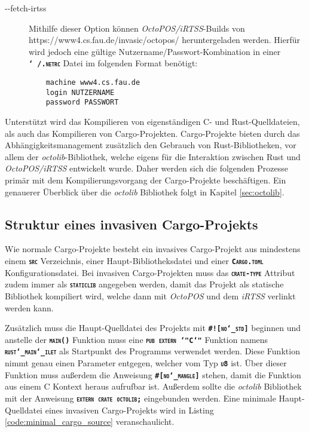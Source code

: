 \begin{description}
	\item[-{}-fetch-irtss]
	Mithilfe dieser Option können \textit{OctoPOS/iRTSS}-Builds von \\
	https://www4.cs.fau.de/invasic/octopos/ heruntergeladen werden. Hierfür wird jedoch
	eine gültige Nutzername/Passwort-Kombination in einer \texttt{\textsc{\textbf{\char`~/.netrc}}}
	Datei im folgenden Format benötigt:
	\begin{verbatim}
	machine www4.cs.fau.de
	login NUTZERNAME
	password PASSWORT
	\end{verbatim}
\end{description}

Unterstützt wird das Kompilieren von eigenständigen C- und Rust-Quelldateien, als auch das Kompilieren von
Cargo-Projekten. Cargo-Projekte bieten durch das Abhängigkeitsmanagement zusätzlich den Gebrauch
von Rust-Bibliotheken, vor allem der \textit{octolib}-Bibliothek,
welche eigens für die Interaktion zwischen Rust und \textit{OctoPOS/iRTSS}
entwickelt wurde.
Daher werden sich die folgenden Prozesse primär mit dem Kompilierungsvorgang der Cargo-Projekte
beschäftigen.
Ein genauerer Überblick über die \textit{octolib} Bibliothek folgt in Kapitel \ref{sec:octolib}.

\subsection{Struktur eines invasiven Cargo-Projekts}

Wie normale Cargo-Projekte besteht ein invasives Cargo-Projekt aus mindestens einem
\texttt{\textsc{\textbf{src}}} Verzeichnis, einer Haupt-Bibliotheksdatei
und einer \texttt{\textsc{\textbf{Cargo.toml}}} Konfigurationsdatei.
Bei invasiven Cargo-Projekten muss das \texttt{\textsc{\textbf{crate-type}}} Attribut zudem immer als
\texttt{\textsc{\textbf{staticlib}}} angegeben werden,
damit das Projekt als statische Bibliothek kompiliert wird, welche dann mit \textit{OctoPOS} und dem \textit{iRTSS} 
verlinkt werden kann.

Zusätzlich muss die Haupt-Quelldatei des Projekts mit \texttt{\textsc{\textbf{\#![no\char`_std]}}} beginnen und 
anstelle der \texttt{\textsc{\textbf{main()}}} Funktion muss eine
\texttt{\textsc{\textbf{pub extern \char`"C\char`"}}} Funktion namens \\
\texttt{\textsc{\textbf{rust\char`_main\char`_ilet}}} als Startpunkt des Programms verwendet werden.
Diese Funktion nimmt genau einen Parameter entgegen, welcher vom Typ \texttt{\textsc{\textbf{u8}}} ist.
Über dieser Funktion muss außerdem die Anweisung \texttt{\textsc{\textbf{\#[no\char`_mangle]}}} stehen,
damit die Funktion aus einem C Kontext heraus aufrufbar ist.
Außerdem sollte die \textit{octolib} Bibliothek mit der Anweisung \texttt{\textsc{\textbf{extern crate octolib;}}}
eingebunden werden. Eine minimale Haupt-Quelldatei eines invasiven Cargo-Projekts wird in Listing 
\ref{code:minimal_cargo_source} veranschaulicht.

